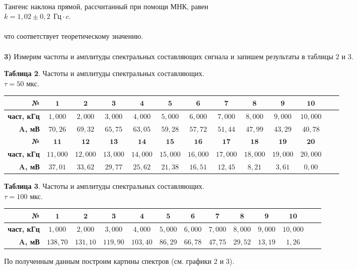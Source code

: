 \documentclass[11pt,a4paper]{article}
\begin{document}
\\
Тангенс наклона прямой, рассчитанный при помощи МНК, равен\\
$\boxed {k = 1,02 \pm 0,2 \ \  \text{Гц}\cdot c}.$\\\\что соответствует теоретическому значению.
\\
\\
\textbf{3)} Измерим частоты и амплитуды спектральных составляющих сигнала и запишем результаты в таблицы $2$ и $3$. 
	
	\begin{table} [h!]
		\centering
	\textbf{Таблица 2}. Частоты и амплитуды спектральных составляющих. \\
	$\tau = 50$ мкс.\\
\begin{tabular}{|r||c|c|c|c|c|c|c|c|c|c|c|c|}
	\hline 
	\textbf{№} & $\textbf{1}$ & $\textbf{2}$ & $\textbf{3}$ & $\textbf{4}$ & $\textbf{5}$ & $\textbf{6}$ & $\textbf{7}$ & $\textbf{8}$ & $\textbf{9}$ & $\textbf{10}$\\ 
	\hline
	\textbf {част, кГц} & $1,000$ & $2,000$ & $3,000$ & $4,000$ & $5,000$ & $6,000$ & $7,000$ & $8,000$ & $9,000$ & $ 10,000$ \\ 
	\hline
	\textbf {A, мВ} & $70,26$ & $69,32$ & $65,75$ & $63,05$ & $59,28$ & $57,72$ & $51,44$ & $47,99$ & $43,29$ & $40,78$ \\ 
	\hline
	\hline
	\textbf{№} & $\textbf{11}$ & $\textbf{12}$ & $\textbf{13}$ & $\textbf{14}$ & $\textbf{15}$ & $\textbf{16}$ & $\textbf{17}$ & $\textbf{18}$ & $\textbf{19}$ & $\textbf{20}$ \\ 
	\hline
	\textbf {част, кГц} & $11,000$ & $12,000$ & $13,000$ & $14,000$ & $15,000$ & $16,000$ & $17,000$ & $18,000$ & $19,000$ & $20,000$ \\ 
	\hline
	\textbf {A, мВ} & $37,01$ & $33,62$ & $29,77$ & $25,62$ & $21,38$ & $16,51$ & $12,45$ & $8,21$ & $3,61$ & $0,00$ \\ 
	\hline
\end{tabular}
\end{table}
\newpage
	\begin{table} [h!]
	\centering
	\textbf{Таблица 3}. Частоты и амплитуды спектральных составляющих. \\
	$\tau = 100$ мкс.\\
	\begin{tabular}{|r||c|c|c|c|c|c|c|c|c|c|c|c|}
		\hline 
		\textbf{№} & $\textbf{1}$ & $\textbf{2}$ & $\textbf{3}$ & $\textbf{4}$ & $\textbf{5}$ & $\textbf{6}$ & $\textbf{7}$ & $\textbf{8}$ & $\textbf{9}$ & $\textbf{10}$\\ 
		\hline
		\textbf {част, кГц} & $1,000$ & $2,000$ & $3,000$ & $4,000$ & $5,000$ & $6,000$ & $7,000$ & $8,000$ & $9,000$ & $ 10,000$ \\ 
		\hline
		\textbf {A, мВ} & $138,70$ & $131,10$ & $119,90$ & $103,40$ & $86,29$ & $66,78$ & $47,75$ & $29,52$ & $13,19$ & $1,26$ \\ 
		\hline
\end{tabular}
\end{table}
По полученным данным построим картины спектров (см. графики $2$ и $3$).
\end{document}
